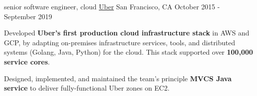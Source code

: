 \begin{cventries}
  \cventry
    {senior software engineer, cloud}
    {\href{http://www.uber.com}{Uber}}
    {San Francisco, CA}
    {October 2015 - September 2019}
    {
      \begin{cvitems} %
        \item {Developed \textbf{Uber's first production cloud infrastructure stack} in AWS and GCP, by adapting on-premises infrastructure services, tools, and distributed systems (Golang, Java, Python) for the cloud. This stack supported over \textbf{100,000 service cores}.}
        \item {Designed, implemented, and maintained the team's principle \textbf{MVCS Java service} to deliver fully-functional Uber zones on EC2.}
      \end{cvitems}
    }

\end{cventries}
